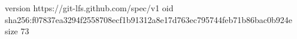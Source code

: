 version https://git-lfs.github.com/spec/v1
oid sha256:f07837ea3294f2558708ecf1b91312a8e17d763ec795744feb71b86bac0b924e
size 73
